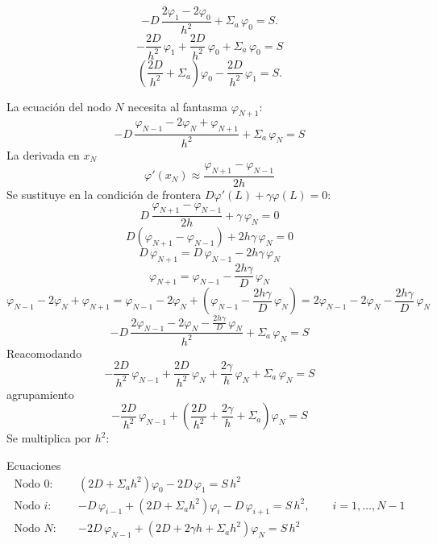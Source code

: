 \[
-D\,\frac{2\varphi_1 - 2\varphi_0}{h^2} + \Sigma_a\,\varphi_0 = S .
\]
\[
-\frac{2D}{h^2}\,\varphi_1 + \frac{2D}{h^2}\,\varphi_0 + \Sigma_a\,\varphi_0 = S
\]
\[
\left(\frac{2D}{h^2} + \Sigma_a\right)\varphi_0 - \frac{2D}{h^2}\,\varphi_1 = S .
\]



La ecuación del nodo $N$ necesita al fantasma $\varphi_{N+1}$:
\[
-D\,\frac{\varphi_{N-1} - 2\varphi_N + \varphi_{N+1}}{h^2} + \Sigma_a\,\varphi_N = S
\]
La derivada en $x_N$
\[
\varphi'(x_N) \approx \frac{\varphi_{N+1} - \varphi_{N-1}}{2h} 
\]
Se sustituye en la condición de frontera $D\varphi'(L) + \gamma\varphi(L) = 0$:
\[
D\,\frac{\varphi_{N+1} - \varphi_{N-1}}{2h} + \gamma\,\varphi_N = 0 
\]
\[
D\left(\varphi_{N+1} - \varphi_{N-1}\right) + 2h\gamma\,\varphi_N = 0 
\]
\[
D\,\varphi_{N+1} = D\,\varphi_{N-1} - 2h\gamma\,\varphi_N 
\]
\[
\varphi_{N+1} = \varphi_{N-1} - \frac{2h\gamma}{D}\,\varphi_N 
\]
\[
\varphi_{N-1} - 2\varphi_N + \varphi_{N+1}
= \varphi_{N-1} - 2\varphi_N + \left(\varphi_{N-1} - \frac{2h\gamma}{D}\,\varphi_N\right)
= 2\varphi_{N-1} - 2\varphi_N - \frac{2h\gamma}{D}\,\varphi_N
\]
\[
-D\,\frac{2\varphi_{N-1} - 2\varphi_N - \frac{2h\gamma}{D}\,\varphi_N}{h^2} + \Sigma_a\,\varphi_N = S
\]
Reacomodando
\[
-\frac{2D}{h^2}\,\varphi_{N-1} + \frac{2D}{h^2}\,\varphi_N + \frac{2\gamma}{h}\,\varphi_N + \Sigma_a\,\varphi_N = S 
\]
agrupamiento
\[
-\frac{2D}{h^2}\,\varphi_{N-1} + \left(\frac{2D}{h^2} + \frac{2\gamma}{h} + \Sigma_a\right)\varphi_N = S 
\]
Se multiplica por $h^2$:



Ecuaciones 
\begin{align*}
	\text{Nodo } 0:\quad & \left(2D + \Sigma_a h^2\right)\varphi_0 - 2D\,\varphi_1 = S\,h^2\\
	\text{Nodo } i:\quad & -D\,\varphi_{i-1} + \left(2D + \Sigma_a h^2\right)\varphi_i - D\,\varphi_{i+1} = S\,h^2, \qquad i = 1, \dots, N-1\\
	\text{Nodo } N:\quad & -2D\,\varphi_{N-1} + \left(2D + 2\gamma h + \Sigma_a h^2\right)\varphi_N = S\,h^2
\end{align*}


